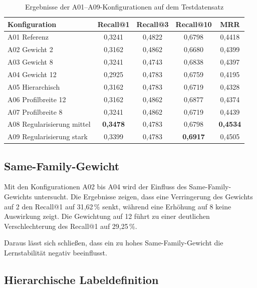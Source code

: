 \begin{table}[H] 
    \centering 
    \caption{Ergebnisse der A01--A09-Konfigurationen auf dem Testdatensatz} 
    \label{tab:konfigurationsvergleich} 
    \small 
    \begin{tabular}{lcccc} 
        \toprule 
        \textbf{Konfiguration} & \textbf{Recall@1} & \textbf{Recall@3} & \textbf{Recall@10} & \textbf{MRR} \\ 
        \midrule 
        A01 Referenz & 0,3241 & 0,4822 & 0,6798 & 0,4418 \\ 
        A02 Gewicht 2 & 0,3162 & 0,4862 & 0,6680 & 0,4399 \\ 
        A03 Gewicht 8 & 0,3241 & 0,4743 & 0,6838 & 0,4397 \\ 
        A04 Gewicht 12 & 0,2925 & 0,4783 & 0,6759 & 0,4195 \\ 
        A05 Hierarchisch & 0,3162 & 0,4783 & 0,6719 & 0,4328 \\ 
        A06 Profilbreite 12 & 0,3162 & 0,4862 & 0,6877 & 0,4374 \\ 
        A07 Profilbreite 8 & 0,3241 & 0,4862 & 0,6719 & 0,4439 \\ 
        A08 Regularisierung mittel & \textbf{0,3478} & 0,4783 & 0,6798 & \textbf{0,4534} \\ 
        A09 Regularisierung stark & 0,3399 & 0,4783 & \textbf{0,6917} & 0,4505 \\ 
        \bottomrule 
    \end{tabular} 
\end{table}

\subsection{Same-Family-Gewicht}

Mit den Konfigurationen A02 bis A04 wird der Einfluss des Same-Family-Gewichts untersucht. 
Die Ergebnisse zeigen, dass eine Verringerung des Gewichts auf 2 den Recall@1 auf 31,62\,\% senkt, während eine Erhöhung auf 8 keine Auswirkung zeigt.
Die Gewichtung auf 12 führt zu einer deutlichen Verschlechterung des Recall@1 auf 29,25\,\%.

Daraus lässt sich schließen, dass ein zu hohes Same-Family-Gewicht die Lernstabilität negativ beeinflusst.

\subsection{Hierarchische Labeldefinition}

